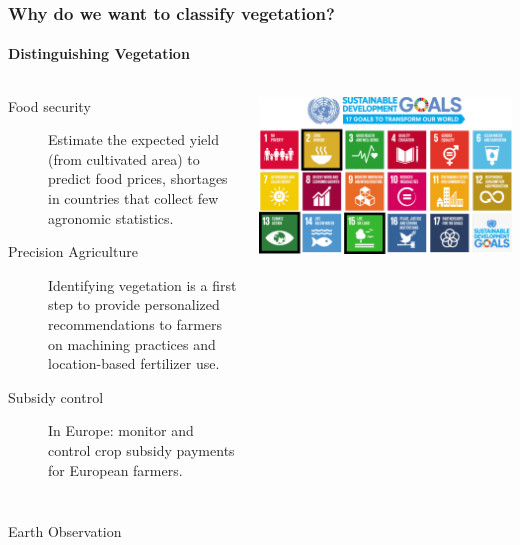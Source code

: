 \documentclass[%
  aspectratio=169,
  9pt,
  USenglish,
]{beamer}
\begin{document}
\begin{frame}
	\frametitle{Why do we want to classify vegetation?}
	\framesubtitle{Distinguishing Vegetation}
	\begin{columns}
		\begin{description}
			\item[Food security] Estimate the expected yield (from cultivated area) to predict food prices, shortages in countries that collect few agronomic statistics.
			\pause
			\item[Precision Agriculture] Identifying vegetation is a first step to provide personalized recommendations to farmers on machining practices and location-based fertilizer use.
			\pause
			\item[Subsidy control] In Europe: monitor and control crop subsidy payments for European farmers.
		\end{description}
		\includegraphics[width=\textwidth]{images/sdg_goals.pdf}
	\end{columns}
	
\end{frame}

{
	\begin{frame}[plain]
		
		\vfill
		\Huge\color{white}
		\begin{center}
			\begin{columns}
				\column{.5\textwidth}
				\vspace{7em}
				
				\hfill 
				Earth Observation
				\column{.5\textwidth}
				
			\end{columns}
		\end{center}
		
		\vfill
	\end{frame}
}
\end{document}
